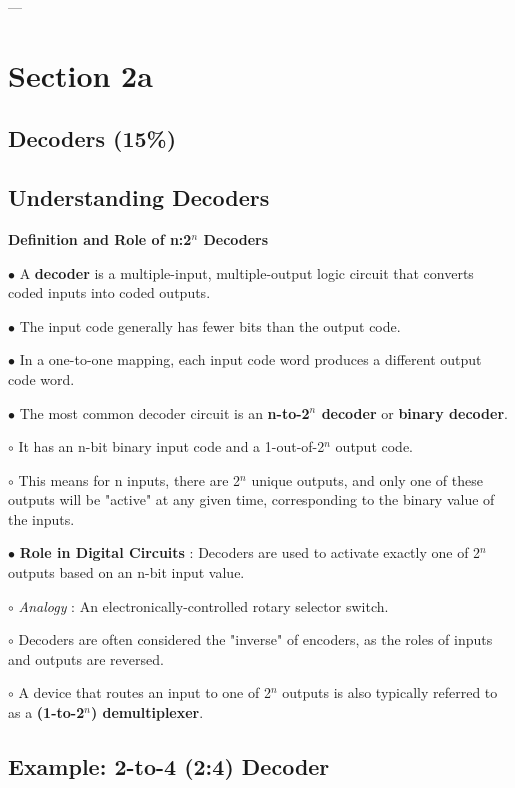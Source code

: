 \documentclass{article}
\begin{document}
---

\section{Section 2a}

\subsection{Decoders (15\%)}

\subsection{Understanding Decoders}

\textbf{Definition and Role of n:2$^{n}$ Decoders}

$\bullet$ A \textbf{decoder} is a multiple-input, multiple-output logic circuit that converts coded inputs into coded outputs.

$\bullet$ The input code generally has fewer bits than the output code.

$\bullet$ In a one-to-one mapping, each input code word produces a different output code word.

$\bullet$ The most common decoder circuit is an \textbf{n-to-2$^{n}$ decoder} or \textbf{binary decoder}.

    $\circ$ It has an n-bit binary input code and a 1-out-of-2$^{n}$ output code.

    $\circ$ This means for n inputs, there are 2$^{n}$ unique outputs, and only one of these outputs will be "active" at any given time, corresponding to the binary value of the inputs.

$\bullet$ \textbf{Role in Digital Circuits} : Decoders are used to activate exactly one of 2$^{n}$ outputs based on an n-bit input value.

    $\circ$ \textit{Analogy} : An electronically-controlled rotary selector switch.

    $\circ$ Decoders are often considered the "inverse" of encoders, as the roles of inputs and outputs are reversed.

    $\circ$ A device that routes an input to one of 2$^{n}$ outputs is also typically referred to as a \textbf{(1-to-2$^{n}$) demultiplexer}.

\subsection{Example: 2-to-4 (2:4) Decoder}
\end{document}
